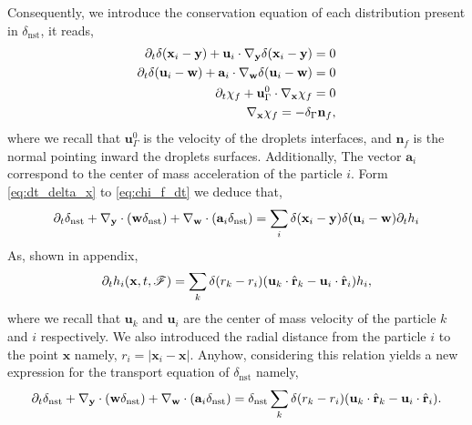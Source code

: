 Consequently, we introduce the  conservation equation of each distribution present in $\delta_\text{nst}$, it reads, 
\begin{align}
    \label{eq:dt_delta_x}
    \pddt \delta(\textbf{x}_i  - \textbf{y})
    +\textbf{u}_i  
    \cdot \pddy \delta(\textbf{x}_i  - \textbf{y})
    = 0\\
    \pddt \delta(\textbf{u}_i -\textbf{w})
    +\textbf{a}_i \cdot  \pddw   \delta(\textbf{u}_i  - \textbf{w})
    = 0\\
    \pddt \chi_f 
    + \textbf{u}_\Gamma^0 
    \cdot \pddx \chi_f = 0 \\
    \pddx \chi_f = - \delta_\Gamma \textbf{n}_f,
    \label{eq:chi_f_dt}
\end{align}
where we recall that $\textbf{u}_\Gamma^0$ is the velocity of the droplets interfaces, and $\textbf{n}_f$ is the normal pointing inward the droplets surfaces. 
Additionally, The vector $\textbf{a}_i$ correspond to the center of mass acceleration of the particle $i$. 
Form \ref{eq:dt_delta_x} to \ref{eq:chi_f_dt} we deduce that, 
\begin{align}
    \partial_t \delta_\text{nst}
    + {\mathbf{\nabla}_\textbf{y}} \cdot (\textbf{w} \delta_\text{nst})
    + {\mathbf{\nabla}_\textbf{w}} \cdot (\textbf{a}_i  \delta_\text{nst})
    = 
    \sum_i \delta(\textbf{x}_i -\textbf{y}) \delta(\textbf{u}_i - \textbf{w}) \partial_t h_i
\end{align}
As, shown in appendix, 
\begin{equation}
    \partial_t  h_i(\textbf{x},t,\mathscr{F})
    = 
    \sum_k 
    \delta(r_k - r_i)
    (\textbf{u}_k  \cdot \hat{\textbf{r}}_k - \textbf{u}_i  \cdot \hat{\textbf{r}}_i)
    h_i,
\end{equation}
where we recall that $\textbf{u}_k$ and $\textbf{u}_i$  are the center of mass velocity of the particle $k$ and $i$ respectively. 
We also introduced the radial distance from the particle $i$ to the point $\textbf{x}$ namely, $r_i = |\textbf{x}_i - \textbf{x}|$.  
Anyhow, considering this relation yields a new expression for the transport equation of $\delta_\text{nst}$ namely,
\begin{equation}
    \partial_t \delta_\text{nst}
    + {\mathbf{\nabla}_\textbf{y}} \cdot (\textbf{w} \delta_\text{nst})
    + {\mathbf{\nabla}_\textbf{w}} \cdot (\textbf{a}_i  \delta_\text{nst})
    = 
    \delta_\text{nst}
    \sum_k 
    \delta(r_k - r_i)
    (\textbf{u}_k  \cdot \hat{\textbf{r}}_k - \textbf{u}_i  \cdot \hat{\textbf{r}}_i). 
\end{equation}
